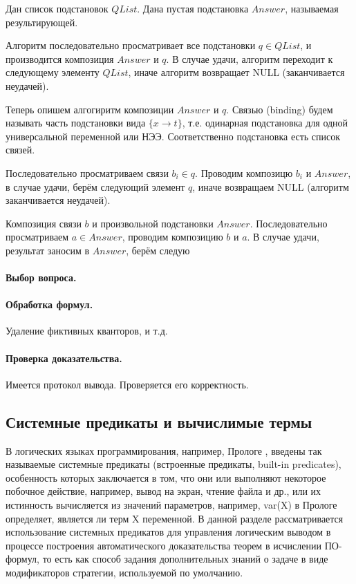 Дан список подстановок $QList$. Дана пустая подстановка $Answer$, называемая результирующей.

Алгоритм последовательно просматривает все подстановки $q \in QList$, и производится композиция $Answer$ и $q$. В случае удачи, алгоритм переходит к следующему элементу $QList$, иначе алгоритм возвращает NULL (заканчивается неудачей).

Теперь опишем алгогиритм композиции $Answer$ и $q$. Связью (binding) будем называть часть подстановки вида $\{x \rightarrow t\}$, т.е. одинарная подстановка для одной универсальной переменной или НЭЭ. Соответственно подстановка есть список связей.

Последовательно просматриваем связи $b_i \in q$. Проводим композицю $b_i$ и $Answer$, в случае удачи, берём следующий элемент $q$, иначе возвращаем NULL (алгоритм заканчивается неудачей).

Композиция связи $b$ и произвольной подстановки $Answer$. Последовательно просматриваем $a \in Answer$, проводим композицию $b$ и $a$. В случае удачи, результат заносим в $Answer$, берём следую 

\paragraph{Выбор вопроса.}

\paragraph{Обработка формул.} Удаление фиктивных кванторов, и т.д.

\paragraph{Проверка доказательства.} Имеется протокол вывода. Проверяется его корректность.

\subsection{Системные предикаты и вычислимые термы}
В логических языках программирования, например, Прологе \cite{Bratko}, введены так называемые системные предикаты (встроенные предикаты, built-in predicates), особенность которых заключается в том, что они или выполняют некоторое побочное действие, например, вывод на экран, чтение файла и др., или их истинность вычисляется из значений параметров, например, var(X) в Прологе определяет, является ли терм X переменной. В данной разделе рассматривается использование системных предикатов для управления логическим выводом в процессе построения автоматического доказательства теорем в исчислении ПО-формул, то есть как способ задания дополнительных знаний о задаче в виде модификаторов стратегии, используемой по умолчанию.

